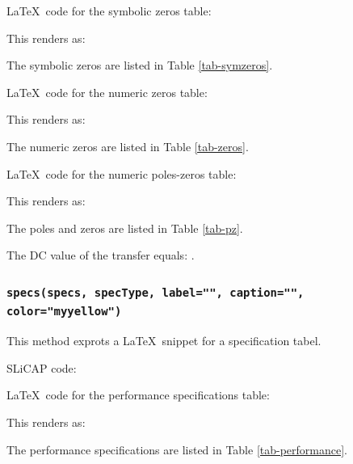 \documentclass[a4paper,12pt]{article}
\begin{document}


\LaTeX$\,$ code for the symbolic zeros table:



This renders as:

The symbolic zeros are listed in Table \ref{tab-symzeros}.



\LaTeX$\,$ code for the numeric zeros table:



This renders as:

The numeric zeros are listed in Table \ref{tab-zeros}.



\LaTeX$\,$ code for the numeric poles-zeros table:



This renders as:

The poles and zeros are listed in Table \ref{tab-pz}.



The DC value of the transfer equals:
.

\subsubsection{\texttt{specs(specs, specType, label="", caption="", color="myyellow")}}

This method exprots a \LaTeX$\,$ snippet for a specification tabel.

SLiCAP code:



\LaTeX$\,$ code for the performance specifications table:



This renders as:

The performance specifications are listed in Table \ref{tab-performance}.


\end{document}
